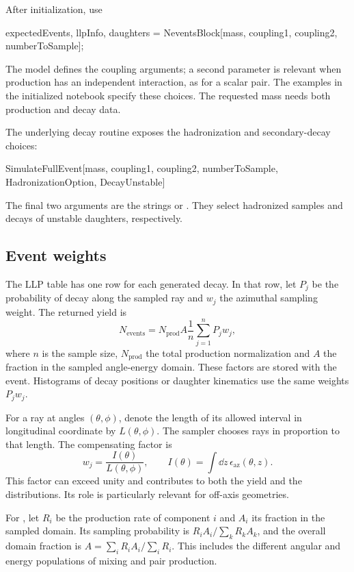 After initialization, use
\begin{Code}
{expectedEvents, llpInfo, daughters} =
  NeventsBlock[mass, coupling1, coupling2, numberToSample];
\end{Code}
The model defines the coupling arguments; a second parameter is relevant when production has an independent interaction, as for a scalar pair. The examples in the initialized notebook specify these choices. The requested mass needs both production and decay data.

The underlying decay routine exposes the hadronization and secondary-decay choices:
\begin{Code}
SimulateFullEvent[mass, coupling1, coupling2, numberToSample,
  HadronizationOption, DecayUnstable]
\end{Code}
The final two arguments are the strings  or . They select hadronized samples and decays of unstable daughters, respectively.

\subsection{Event weights}
The LLP table has one row for each generated decay. In that row, let $P_j$ be the probability of decay along the sampled ray and $w_j$ the azimuthal sampling weight. The returned yield is
\begin{equation}\label{eq:events}
 N_{\mathrm{events}}=N_{\mathrm{prod}}A\frac1n\sum_{j=1}^{n}P_jw_j,
\end{equation}
where $n$ is the sample size, $N_{\mathrm{prod}}$ the total production normalization and $A$ the fraction in the sampled angle-energy domain. These factors are stored with the event. Histograms of decay positions or daughter kinematics use the same weights $P_jw_j$.

For a ray at angles $(\theta,\phi)$, denote the length of its allowed interval in longitudinal coordinate by $L(\theta,\phi)$. The sampler chooses rays in proportion to that length. The compensating factor is
\begin{equation}
 w_j=\frac{I(\theta)}{L(\theta,\phi)},\qquad
 I(\theta)=\int\dd z\,\epsilon_{\mathrm{az}}(\theta,z).
\end{equation}
This factor can exceed unity and contributes to both the yield and the distributions. Its role is particularly relevant for off-axis geometries.

For , let $R_i$ be the production rate of component $i$ and $A_i$ its fraction in the sampled domain. Its sampling probability is $R_iA_i/\sum_k R_kA_k$, and the overall domain fraction is $A=\sum_i R_iA_i/\sum_i R_i$. This includes the different angular and energy populations of mixing and pair production.

